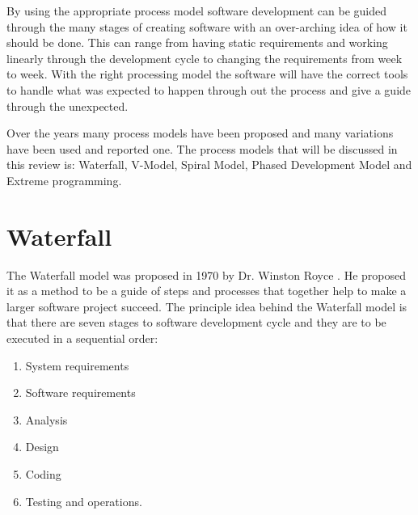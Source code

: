 \documentclass{style/CRPITStyle}
\renewcommand{\cite}{\citep}
\begin{document}
By using the appropriate process model software development can be guided
through the many stages of creating software with an over-arching idea of how it
should be done. This can range from having static requirements and working
linearly through the development cycle to changing the requirements from week to
week. With the right processing model the software will have the correct tools
to handle what was expected to happen through out the process and give a guide
through the unexpected.


\vspace{.1in}

Over the years many process models have been proposed and many variations have
been used and reported one. The process models that will be discussed in this
review is: Waterfall, V-Model, Spiral Model, Phased Development Model and
Extreme programming.

\section{Waterfall} %

The Waterfall model was proposed in 1970 by Dr. Winston Royce \cite{Waterfall:1970}.
He proposed it as a method to be a guide of steps and processes that together
help to make a larger software project succeed. 
The principle idea behind the Waterfall model is that there are seven stages to
software development cycle and they are to be executed in a sequential order:

\begin{enumerate}
  \item System requirements
  \item Software requirements
  \item Analysis
  \item Design
  \item Coding
  \item Testing and operations.
\end{enumerate}
\end{document}
